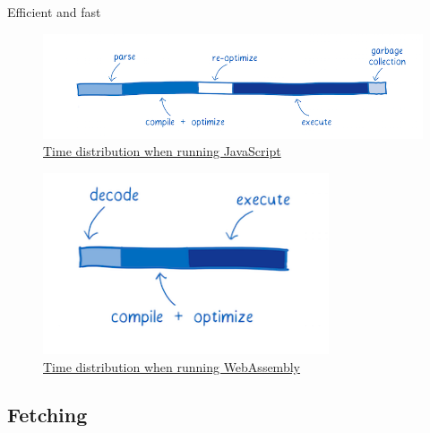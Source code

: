 \documentclass{beamer}
\begin{document}
\begin{frame}{Efficient and fast}
    \begin{figure}
        \includegraphics[scale=0.3]{./images/javascriptgraph.png}
        \caption{\href{https://www.smashingmagazine.com/2017/05/abridged-cartoon-introduction-webassembly/}{Time distribution when running JavaScript}}
    \end{figure}
    \begin{figure}
        \includegraphics[scale=0.4]{./images/wasmgraph.png}
        \caption{\href{https://www.smashingmagazine.com/2017/05/abridged-cartoon-introduction-webassembly/}{Time distribution when running WebAssembly}}
    \end{figure}
\end{frame}

\subsection{Fetching} 
\end{document}
